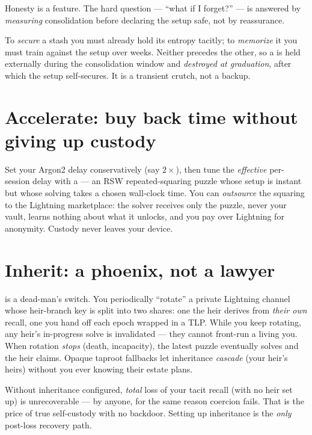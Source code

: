 \documentclass[a4paper,11pt]{report}
\begin{document}
\begin{keyidea}
Honesty is a feature. The hard question — ``what if I forget?'' — is answered by
\emph{measuring} consolidation before declaring the setup safe, not by
reassurance.
\end{keyidea}

\begin{deeper}
To \emph{secure} a stash you must already hold its entropy tacitly; to
\emph{memorize} it you must train against the setup over weeks. Neither precedes
the other, so a  is held externally during the
consolidation window and \emph{destroyed at graduation}, after which the setup
self-secures. It is a transient crutch, not a backup.
\end{deeper}

\section{Accelerate: buy back time without giving up custody}
Set your Argon2 delay conservatively (say $2\times$), then tune the
\emph{effective} per-session delay with a  — an
RSW repeated-squaring puzzle whose setup is instant but whose solving takes a
chosen wall-clock time. You can \emph{outsource} the squaring to the
 Lightning marketplace: the solver receives only the puzzle, never
your vault, learns nothing about what it unlocks, and you pay over Lightning for
anonymity. Custody never leaves your device.

\section{Inherit: a phoenix, not a lawyer}
 is a dead-man's switch. You periodically ``rotate'' a
private Lightning channel whose heir-branch key is split into two shares: one the
heir derives from \emph{their own} \GW{} recall, one you hand off each epoch
wrapped in a TLP. While you keep rotating, any heir's in-progress solve is
invalidated — they cannot front-run a living you. When rotation \emph{stops}
(death, incapacity), the latest puzzle eventually solves and the heir claims.
Opaque taproot fallbacks let inheritance \emph{cascade} (your heir's heirs)
without you ever knowing their estate plans.

\begin{pitfall}
Without inheritance configured, \emph{total} loss of your tacit recall (with no
heir set up) is unrecoverable — by anyone, for the same reason coercion fails.
That is the price of true self-custody with no backdoor. Setting up inheritance is
the \emph{only} post-loss recovery path.
\end{pitfall}
\end{document}
